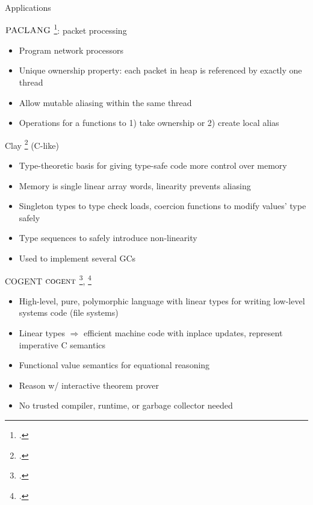\documentclass[aspectratio=169]{beamer}
\begin{document}
\begin{frame}{Applications}
\footnotesize{
$\textsc{PACLANG}$ \footcite{ennals_linear_2004}: packet processing
  \begin{itemize}
    \item Program network processors %
    \item Unique ownership property: each packet in heap is referenced by exactly one thread
    \item Allow mutable aliasing within the same thread
    \item Operations for a functions to 1) take ownership or 2) create local alias
  \end{itemize}
Clay \footcite{hawblitzel_low-level_2004} (C-like)
  \begin{itemize}
    \item Type-theoretic basis for giving type-safe code more control over memory
    \item Memory is single linear array words, linearity prevents aliasing
    \item Singleton types to type check loads, coercion functions to modify values' type safely
    \item Type sequences to safely introduce non-linearity %
    \item Used to implement several GCs
  \end{itemize}
}
\end{frame}

\begin{frame}{COGENT}
$\textsc{cogent}$ \footcite{amani_cogent:_2016}, \footcite{oconnor_cogent:_2016}
    \begin{itemize}
        \item High-level, pure, polymorphic language with linear types for writing low-level systems code (file systems)
        \item Linear types $\Rightarrow$ efficient machine code with inplace updates, represent imperative C semantics
        \item Functional value semantics for equational reasoning
        \item Reason w/ interactive theorem prover
        \item No trusted compiler, runtime, or garbage collector needed
    \end{itemize}
\end{frame}
\end{document}

